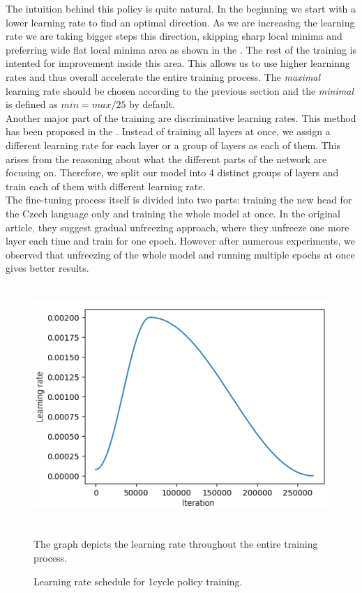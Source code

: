 The intuition behind this policy is quite natural. In the beginning we start with a lower learning rate to find an optimal direction. As we are increasing the learning rate we are taking bigger steps this direction, skipping sharp local minima and preferring wide flat local minima area as shown in the \citet{smith2019super}. The rest of the training is intented for improvement inside this area. This allows us to use higher learninng rates and thus overall accelerate the entire training process. The \textit{maximal} learning rate should be chosen according to the previous section and the \textit{minimal} is defined as $ min = max / 25$ by default.\\

Another major part of the training are discriminative learning rates. This method has been proposed in the \citet{howard2018universal}. Instead of training all layers at once, we assign a different learning rate for each layer or a group of layers as each of them. This arises from the reasoning about what the different parts of the network are focusing on. Therefore, we split our model into 4 distinct groups of layers and train each of them with different learning rate.\\

The fine-tuning process itself is divided into two parts: training the new head for the Czech language only and training the whole model at once. In the original article, they suggest gradual unfreezing approach, where they unfreeze one more layer each time and train for one epoch. However after numerous experiments, we observed that unfreezing of the whole model and running multiple epochs at once gives better results.

\begin{figure}[h]\centering
\includegraphics[width=130mm, height=91mm]{../img/lrSchedule}
\caption{Learning rate schedule for 1cycle policy training.}
\label{fig03:lrSchedule}
The graph depicts the learning rate throughout the entire training process.
\end{figure}

